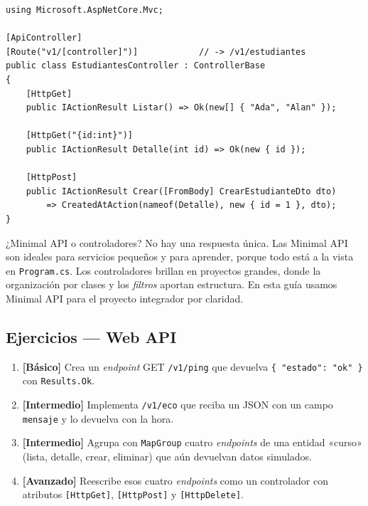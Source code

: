 \documentclass[11pt]{article}
\begin{document}
\begin{cajacodigo}
\begin{lstlisting}[style=cs]
using Microsoft.AspNetCore.Mvc;

[ApiController]
[Route("v1/[controller]")]            // -> /v1/estudiantes
public class EstudiantesController : ControllerBase
{
    [HttpGet]
    public IActionResult Listar() => Ok(new[] { "Ada", "Alan" });

    [HttpGet("{id:int}")]
    public IActionResult Detalle(int id) => Ok(new { id });

    [HttpPost]
    public IActionResult Crear([FromBody] CrearEstudianteDto dto)
        => CreatedAtAction(nameof(Detalle), new { id = 1 }, dto);
}
\end{lstlisting}
\end{cajacodigo}
\vspace{2pt}
\begin{cajatip}{¿Minimal API o controladores?}
No hay una respuesta única. Las Minimal API son ideales para servicios pequeños y para aprender, porque todo está a la vista en \texttt{Program.cs}. Los controladores brillan en proyectos grandes, donde la organización por clases y los \emph{filtros} aportan estructura. En esta guía usamos Minimal API para el proyecto integrador por claridad.\par
\end{cajatip}

\subsection{Ejercicios — Web API}
\begin{enumerate}[leftmargin=1.7em,itemsep=3pt,topsep=2pt]
\item \textbf{[Básico]} Crea un \emph{endpoint} GET \texttt{/v1/ping} que devuelva \texttt{\{ "estado": "ok" \}} con \texttt{Results.Ok}.
\item \textbf{[Intermedio]} Implementa \texttt{/v1/eco} que reciba un JSON con un campo \texttt{mensaje} y lo devuelva con la hora.
\item \textbf{[Intermedio]} Agrupa con \texttt{MapGroup} cuatro \emph{endpoints} de una entidad «curso» (lista, detalle, crear, eliminar) que aún devuelvan datos simulados.
\item \textbf{[Avanzado]} Reescribe esos cuatro \emph{endpoints} como un controlador con atributos \texttt{[HttpGet]}, \texttt{[HttpPost]} y \texttt{[HttpDelete]}.
\end{enumerate}
\end{document}
